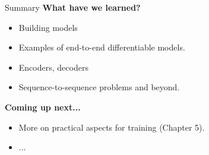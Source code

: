 \begin{frame}{Summary}
\textbf{What have we learned?}
\begin{itemize}
\item Building models
\item Examples of end-to-end differentiable models.
\item Encoders, decoders
\item Sequence-to-sequence problems and beyond.
\end{itemize}
\vsp
\textbf{Coming up next...}
\begin{itemize}
\item More on practical aspects for training (Chapter 5).
\item ...
\end{itemize}
\end{frame}
